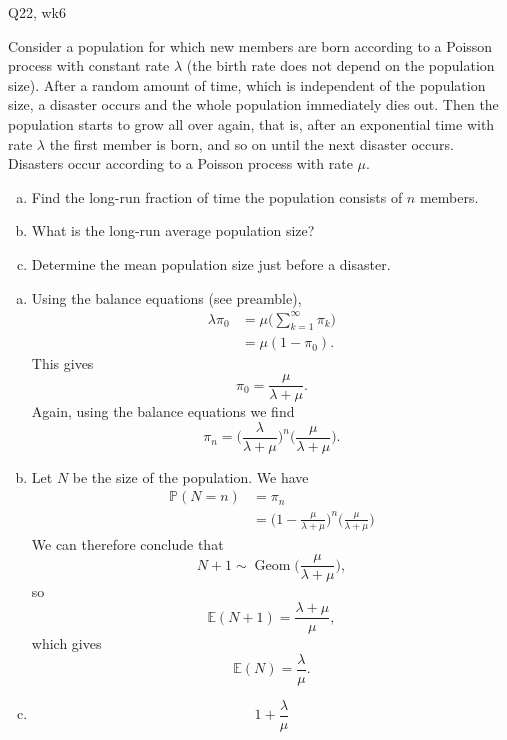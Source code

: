 \begin{problem}{Q22, wk6}{}


    Consider a population for which new members are born according to a Poisson process with constant  rate $\lambda$ (the  birth  rate  does  not  depend  on  the  population  size).   After  a  random amount of time, which is independent of the population size, a disaster occurs and the whole population immediately dies out.  Then the population starts to grow all over again, that is, after an exponential time with rate $\lambda$ the first member is born, and so on until the next disaster occurs. Disasters occur according to a Poisson process with rate $\mu$.
    \begin{enumerate}[a)]
        \item Find the long-run fraction of time the population consists of $n$ members.
        \item What is the long-run average population size?
        \item Determine the mean population size just before a disaster.
    \end{enumerate}

    \tcblower

    \begin{enumerate}[a)]
        \item Using the balance equations (see preamble),
            \begin{align*}
                \lambda \pi_0 &= \mu \biggl( \sum_{k = 1}^\infty \pi_k \biggr) \\
                &= \mu (1 - \pi_0) .
            \end{align*}
        This gives
            $$ \pi_0 = \frac{\mu}{\lambda + \mu} . $$
        Again, using the balance equations we find
            $$ \pi_n = \biggl( \frac{\lambda}{\lambda + \mu} \biggr)^n \biggl( \frac{\mu}{\lambda + \mu} \biggr) . $$
        \item Let $N$ be the size of the population. We have
            \begin{align*}
                \mathbb{P}(N = n) &= \pi_n \\
                &= \biggl( 1 - \frac{\mu}{\lambda + \mu} \biggr)^n \biggl( \frac{\mu}{\lambda + \mu} \biggr)
            \end{align*}
            We can therefore conclude that
                $$ N + 1 \sim \operatorname{Geom}\biggl( \frac{\mu}{\lambda + \mu} \biggr) , $$
            so
                $$ \mathbb{E}(N + 1) = \frac{\lambda + \mu}{\mu} , $$
            which gives
                $$ \mathbb{E}(N) = \frac{\lambda}{\mu} . $$
        \item
            $$ 1 + \frac{\lambda}{\mu} $$
    \end{enumerate}

\end{problem}

